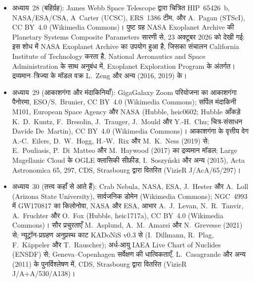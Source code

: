 \begin{itemize}
  \item अध्याय~28 (बहिर्ग्रह): James Webb Space Telescope द्वारा चित्रित HIP~65426~b, NASA/\allowbreak ESA/\allowbreak CSA, A~Carter (UCSC), ERS~1386 टीम, और A.~Pagan (STScI), CC BY~4.0 (Wikimedia Commons)। पुष्ट ग्रह NASA Exoplanet Archive की Planetary Systems Composite Parameters सारणी से, 23 अक्टूबर 2026 को देखी गई: इस शोध में NASA Exoplanet Archive का उपयोग हुआ है, जिसका संचालन California Institute of Technology करता है, National Aeronautics and Space Administration के साथ अनुबंध में, Exoplanet Exploration Program के अंतर्गत। द्रव्यमान--त्रिज्या के मॉडल वक्र L.~Zeng और अन्य (2016, 2019) के।
  \item अध्याय~29 (आकाशगंगा और मंदाकिनियाँ): GigaGalaxy Zoom परियोजना का आकाशगंगा पैनोरमा, ESO/S.~Brunier, CC BY~4.0 (Wikimedia Commons); सर्पिल मंदाकिनी M101, European Space Agency और NASA (Hubble, heic0602; Hubble आँकड़े K.~D.~Kuntz, F.~Bresolin, J.~Trauger, J.~Mould और Y.-H.~Chu; चित्र-संसाधन Davide De~Martin), CC BY~4.0 (Wikimedia Commons)। आकाशगंगा के वृत्तीय वेग A.-C.~Eilers, D.~W.~Hogg, H.-W.~Rix और M.~K.~Ness (2019) से; E.~Pouliasis, P.~Di~Matteo और M.~Haywood (2017) का द्रव्यमान मॉडल; Large Magellanic Cloud के OGLE क्लासिकी सीफ़ीड, I.~Soszy\'nski और अन्य (2015), Acta Astronomica 65, 297, CDS, Strasbourg द्वारा वितरित (VizieR J/AcA/65/297)।
  \item अध्याय~30 (तत्त्व कहाँ से आते हैं): Crab Nebula, NASA, ESA, J.~Hester और A.~Loll (Arizona State University), सार्वजनिक डोमेन (Wikimedia Commons); NGC~4993 में GW170817 का किलोनोवा, NASA और ESA, आभार A.~J.~Levan, N.~R.~Tanvir, A.~Fruchter और O.~Fox (Hubble, heic1717a), CC BY~4.0 (Wikimedia Commons)। सौर प्रचुरताएँ M.~Asplund, A.~M.~Amarsi और N.~Grevesse (2021) से; न्यूट्रॉन-प्रग्रहण अनुप्रस्थ काट KADoNiS v0.3 से (I.~Dillmann, R.~Plag, F.~K\"appeler और T.~Rauscher); अर्ध-आयु IAEA Live Chart of Nuclides (ENSDF) से; Geneva--Copenhagen सर्वेक्षण की धात्विकताएँ, L.~Casagrande और अन्य (2011) के पुनर्विश्लेषण में, CDS, Strasbourg द्वारा वितरित (VizieR J/A+A/530/A138)।
\end{itemize}
